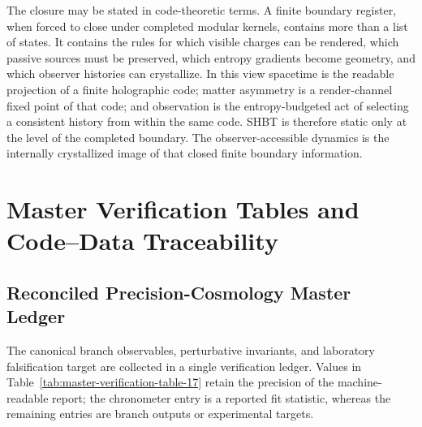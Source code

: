 \documentclass[11pt,letterpaper]{article}
\theoremstyle{plain}
\begin{document}
The closure may be stated in code-theoretic terms.  A
finite boundary register, when forced to close under completed modular kernels,
contains more than a list of states.  It contains the rules for which visible
charges can be rendered, which passive sources must be preserved, which entropy
gradients become geometry, and which observer histories can crystallize.  In
this view spacetime is the readable projection of a finite holographic code;
matter asymmetry is a render-channel fixed point of that code; and observation
is the entropy-budgeted act of selecting a consistent history from within the
same code.  SHBT is therefore static only at the level of the completed
boundary.  The observer-accessible dynamics is the internally
crystallized image of that closed finite boundary information.

\section{Master Verification Tables and Code--Data Traceability}
\label{sec:code-availability}

\subsection{Reconciled Precision-Cosmology Master Ledger}

The canonical branch observables, perturbative invariants, and laboratory
falsification target are collected in a single verification ledger.  Values in
Table~\ref{tab:master-verification-table-17} retain the precision of the
machine-readable report; the chronometer entry is a reported fit statistic,
whereas the remaining entries are branch outputs or experimental targets.
\end{document}
